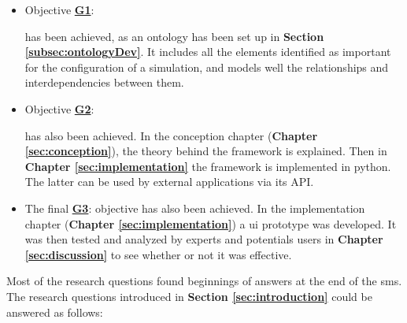 \begin{itemize}
    \item Objective \hyperref[G1]{\textbf{G1}}:  
    
    has been achieved, as an ontology has been set up in \textbf{Section \ref{subsec:ontologyDev}}. It includes all the elements identified as important for the configuration of a simulation, and models well the relationships and interdependencies between them.
    
    
    \item Objective \hyperref[G2]{\textbf{G2}}:
    
    has also been achieved. In the conception chapter (\textbf{Chapter \ref{sec:conception}}), the theory behind the framework is explained. Then in \textbf{Chapter \ref{sec:implementation}} the framework is implemented in python. The latter can be used by external applications via its API.
    
    
    \item The final \hyperref[G3]{\textbf{G3}}: objective has also been achieved. In the implementation chapter (\textbf{Chapter \ref{sec:implementation}}) a \acrshort{ui} prototype was developed. It was then tested and analyzed by experts and potentials users in \textbf{Chapter \ref{sec:discussion}} to see whether or not it was effective.
\end{itemize}
    
\clearpage



Most of the research questions found beginnings of answers at the end of the  \acrfull{sms}. The research questions introduced in \textbf{Section \ref{sec:introduction}} could be answered as follows:\\


